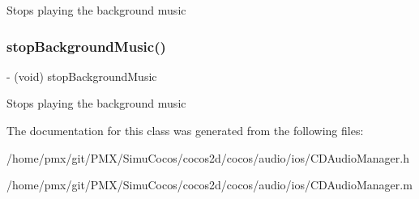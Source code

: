 Stops playing the background music \mbox{\label{interfaceCDAudioManager_a2403abdc32f144a0d57d915db42d35a6}} 
\subsubsection{\texorpdfstring{stop\+Background\+Music()}{stopBackgroundMusic()}\hspace{0.1cm}{\footnotesize\ttfamily [4/4]}}
{\footnotesize\ttfamily -\/ (void) stop\+Background\+Music \begin{DoxyParamCaption}{ }\end{DoxyParamCaption}}

Stops playing the background music 

The documentation for this class was generated from the following files\+:\begin{DoxyCompactItemize}
\item 
/home/pmx/git/\+P\+M\+X/\+Simu\+Cocos/cocos2d/cocos/audio/ios/C\+D\+Audio\+Manager.\+h\item 
/home/pmx/git/\+P\+M\+X/\+Simu\+Cocos/cocos2d/cocos/audio/ios/C\+D\+Audio\+Manager.\+m\end{DoxyCompactItemize}
